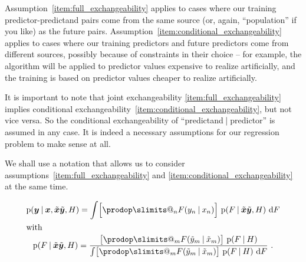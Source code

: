 \documentclass[\ifafour a4paper,12pt,\else a5paper,10pt,\fi%
onecolumn,oneside,article,%
british%
]{memoir}
\makeatletter
\theoremstyle{remark}
\theoremstyle{innote}
\def\prod{\DOTSI\prodop\slimits@}
\newcommand*{\di}{\mathrm{d}}%
\newcommand*{\p}{\mathrm{p}}%
\renewcommand*{\|}[1][]{\nonscript\:#1\vert\nonscript\:\mathopen{}}
\newcommand*{\xx}[1]{x_{#1}}
\newcommand*{\yy}[1]{y_{#1}}
\newcommand*{\bx}{\bm{x}}
\newcommand*{\by}{\bm{y}}
\newcommand*{\xxx}[1]{\tilde{x}_{#1}}
\newcommand*{\yyy}[1]{\tilde{y}_{#1}}
\newcommand*{\bzz}{\tilde{\bm{x}}\tilde{\bm{y}}}
\makeatother
\begin{document}
Assumption~\ref{item:full_exchangeability} applies to cases where our
training predictor-predictand pairs come from the same source (or, again,
\enquote{population} if you like) as the future pairs.
Assumption~\ref{item:conditional_exchangeability} applies to cases where
our training predictors and future predictors come from different sources,
possibly because of constraints in their choice -- for example, the
algorithm will be applied to predictor values expensive to realize
artificially, and the training is based on predictor values cheaper to
realize artificially.

It is important to note that joint exchangeability
\ref{item:full_exchangeability} implies conditional
exchangeability~\ref{item:conditional_exchangeability}, but not vice versa.
So the conditional exchangeability of \enquote{predictand${}\|{}$predictor}
is assumed in any case. It is indeed a necessary assumptions for our
regression problem to make sense at all.

We shall use a notation that allows us to consider
assumptions~\ref{item:full_exchangeability} and
\ref{item:conditional_exchangeability} at the same time.

\begin{subequations} \label{eq:exchangeable_conditional}
  \begin{gather}
    \label{eq:marginalize_conditional}
    \p(\by \| \bx, \bzz, H) =
    \int \Bigl[\prod_{n} F(\yy{n}\|\xx{n})\Bigr] \ \p(F \| \bzz, H)\ \di F
    \\\shortintertext{with}
    \label{eq:update_conditional}
    \p(F \| \bzz, H) =
    \frac{
      \bigl[\prod_{m} F(\yyy{m}\|\xxx{m}) \bigr]\ \p(F \| H)
    }{
      \int \bigl[\prod_{m} F(\yyy{m}\|\xxx{m}) \bigr]\ \p(F \| H)\ \di F
    } \ .
  \end{gather}
\end{subequations}
\end{document}
